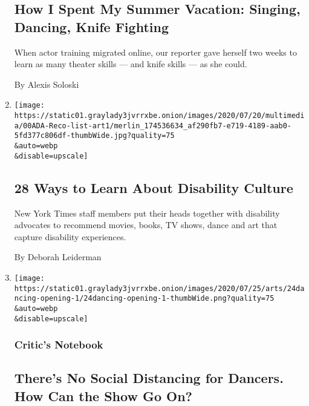 \begin{enumerate}
  \hypertarget{how-i-spent-my-summer-vacation-singing-dancing-knife-fighting}{%
  \subsection{How I Spent My Summer Vacation: Singing, Dancing, Knife
  Fighting}\label{how-i-spent-my-summer-vacation-singing-dancing-knife-fighting}}

  When actor training migrated online, our reporter gave herself two
  weeks to learn as many theater skills --- and knife skills --- as she
  could.

  By Alexis Soloski
\item
  \href{/2020/07/24/arts/disability-movies-books-tv.html}{}

  \texttt{[image: https://static01.graylady3jvrrxbe.onion/images/2020/07/20/multimedia/00ADA-Reco-list-art1/merlin\_174536634\_af290fb7-e719-4189-aab0-5fd377c806df-thumbWide.jpg?quality=75\\\&auto=webp\\\&disable=upscale]}

  \hypertarget{28-ways-to-learn-about-disability-culture}{%
  \subsection{28 Ways to Learn About Disability
  Culture}\label{28-ways-to-learn-about-disability-culture}}

  New York Times staff members put their heads together with disability
  advocates to recommend movies, books, TV shows, dance and art that
  capture disability experiences.

  By Deborah Leiderman
\item
  \href{/2020/07/24/arts/dance/safety-protocols-dance-coronavirus.html}{}

  \texttt{[image: https://static01.graylady3jvrrxbe.onion/images/2020/07/25/arts/24dancing-opening-1/24dancing-opening-1-thumbWide.png?quality=75\\\&auto=webp\\\&disable=upscale]}

  \hypertarget{critics-notebook-1}{%
  \subsubsection{Critic's Notebook}\label{critics-notebook-1}}

  \hypertarget{theres-no-social-distancing-for-dancers-how-can-the-show-go-on}{%
  \subsection{There's No Social Distancing for Dancers. How Can the Show
  Go
  On?}\label{theres-no-social-distancing-for-dancers-how-can-the-show-go-on}}


\end{enumerate}
